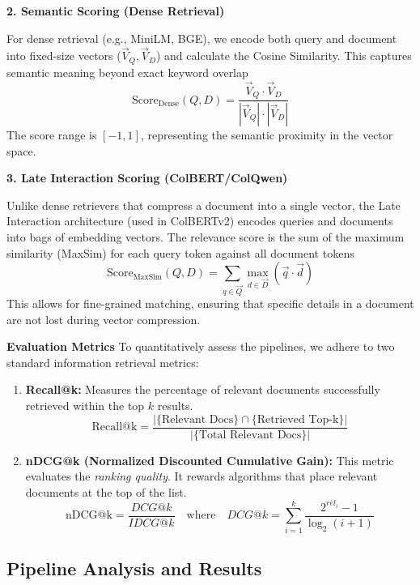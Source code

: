 \textbf{2. Semantic Scoring (Dense Retrieval)}

For dense retrieval (e.g., MiniLM, BGE), we encode both query and document into fixed-size vectors ($\vec{V}_Q, \vec{V}_D$) and calculate the Cosine Similarity. This captures semantic meaning beyond exact keyword overlap
\begin{equation*}
    \text{Score}_{\text{Dense}}(Q, D) = \frac{\vec{V}_{Q} \cdot \vec{V}_{D}}{|\vec{V}_{Q}| \cdot |\vec{V}_{D}|}
\end{equation*}
The score range is $[-1, 1]$, representing the semantic proximity in the vector space.

\textbf{3. Late Interaction Scoring (ColBERT/ColQwen)}

Unlike dense retrievers that compress a document into a single vector, the Late Interaction architecture (used in ColBERTv2) encodes queries and documents into bags of embedding vectors. The relevance score is the sum of the maximum similarity (MaxSim) for each query token against all document tokens
\begin{equation*}
    \text{Score}_{\text{MaxSim}}(Q, D) = \sum_{q \in \vec{Q}} \max_{d \in \vec{D}} (\vec{q} \cdot \vec{d})
\end{equation*}
This allows for fine-grained matching, ensuring that specific details in a document are not lost during vector compression.

\textbf{Evaluation Metrics}
To quantitatively assess the pipelines, we adhere to two standard information retrieval metrics:

\begin{enumerate}
    \item \textbf{Recall@k:} Measures the percentage of relevant documents successfully retrieved within the top $k$ results.
    \[
    \text{Recall@k} = \frac{| \{ \text{Relevant Docs} \} \cap \{ \text{Retrieved Top-k} \} |}{| \{ \text{Total Relevant Docs} \} |}
    \]
    \item \textbf{nDCG@k (Normalized Discounted Cumulative Gain):} This metric evaluates the \textit{ranking quality}. It rewards algorithms that place relevant documents at the top of the list.
    \[
    \text{nDCG@k} = \frac{DCG@k}{IDCG@k} \quad \text{where} \quad DCG@k = \sum_{i=1}^{k} \frac{2^{rel_i} - 1}{\log_2(i+1)}
    \]
\end{enumerate}

\subsection{Pipeline Analysis and Results}


